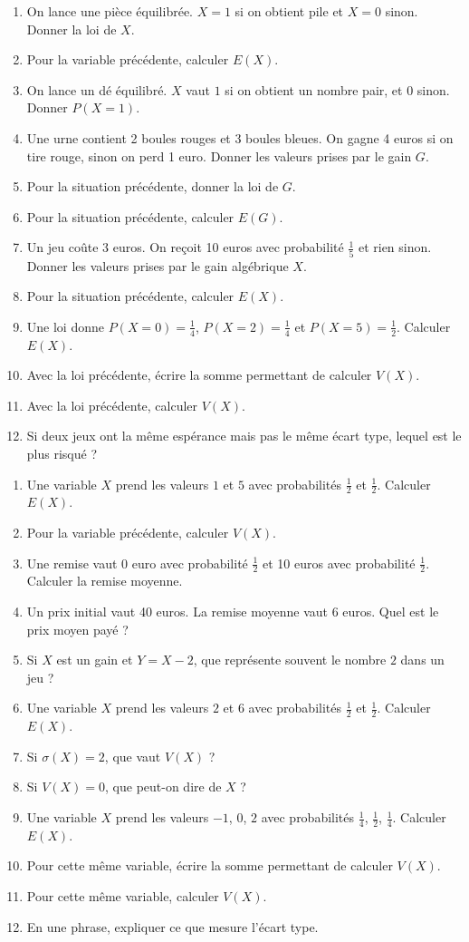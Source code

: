 \documentclass[11pt,a4paper]{article}
\newcounter{question}
\newenvironment{blocquestions}[1]{%
  \begin{tcolorbox}[enhanced,breakable,colback=bleuclair,colframe=bleufonce,boxrule=0.6pt,arc=2mm,left=2mm,right=2mm,top=2mm,bottom=1.5mm,title={\bfseries #1},coltitle=white,colbacktitle=bleufonce,before skip=3mm,after skip=3mm, fontupper=\large]
  \large
  \begin{enumerate}[leftmargin=*,label=\textbf{\arabic*.},itemsep=0.82em,topsep=0.5em]
  \setcounter{enumi}{\value{question}}
}{%
  \setcounter{question}{\value{enumi}}
  \end{enumerate}
  \end{tcolorbox}
}
\begin{document}
\begin{blocquestions}{Questions flash 13 à 24}
\item On lance une pièce équilibrée. $X=1$ si on obtient pile et $X=0$ sinon. Donner la loi de $X$.
\item Pour la variable précédente, calculer $E(X)$.
\item On lance un dé équilibré. $X$ vaut $1$ si on obtient un nombre pair, et $0$ sinon. Donner $P(X=1)$.
\item Une urne contient 2 boules rouges et 3 boules bleues. On gagne 4 euros si on tire rouge, sinon on perd 1 euro. Donner les valeurs prises par le gain $G$.
\item Pour la situation précédente, donner la loi de $G$.
\item Pour la situation précédente, calculer $E(G)$.
\item Un jeu coûte 3 euros. On reçoit 10 euros avec probabilité $\frac15$ et rien sinon. Donner les valeurs prises par le gain algébrique $X$.
\item Pour la situation précédente, calculer $E(X)$.
\item Une loi donne $P(X=0)=\frac14$, $P(X=2)=\frac14$ et $P(X=5)=\frac12$. Calculer $E(X)$.
\item Avec la loi précédente, écrire la somme permettant de calculer $V(X)$.
\item Avec la loi précédente, calculer $V(X)$.
\item Si deux jeux ont la même espérance mais pas le même écart type, lequel est le plus risqué ?
\end{blocquestions}
\begin{blocquestions}{Questions flash 25 à 36}
\item Une variable $X$ prend les valeurs $1$ et $5$ avec probabilités $\frac12$ et $\frac12$. Calculer $E(X)$.
\item Pour la variable précédente, calculer $V(X)$.
\item Une remise vaut 0 euro avec probabilité $\frac12$ et 10 euros avec probabilité $\frac12$. Calculer la remise moyenne.
\item Un prix initial vaut 40 euros. La remise moyenne vaut 6 euros. Quel est le prix moyen payé ?
\item Si $X$ est un gain et $Y=X-2$, que représente souvent le nombre $2$ dans un jeu ?
\item Une variable $X$ prend les valeurs $2$ et $6$ avec probabilités $\frac12$ et $\frac12$. Calculer $E(X)$.
\item Si $\sigma(X)=2$, que vaut $V(X)$ ?
\item Si $V(X)=0$, que peut-on dire de $X$ ?
\item Une variable $X$ prend les valeurs $-1$, $0$, $2$ avec probabilités $\frac14$, $\frac12$, $\frac14$. Calculer $E(X)$.
\item Pour cette même variable, écrire la somme permettant de calculer $V(X)$.
\item Pour cette même variable, calculer $V(X)$.
\item En une phrase, expliquer ce que mesure l'écart type.
\end{blocquestions}
\end{document}
